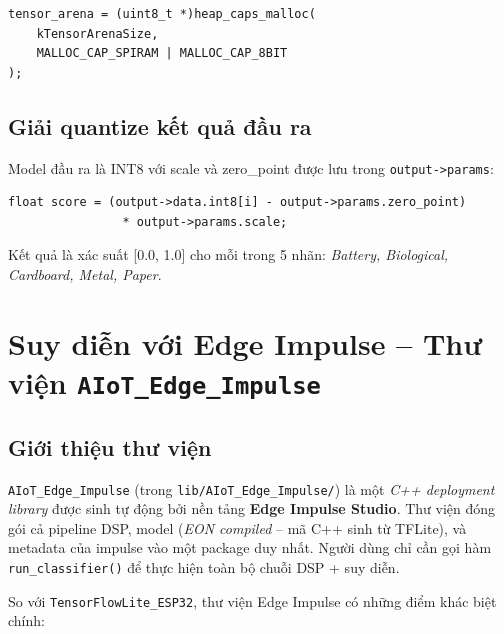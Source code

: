 \documentclass[12pt,a4paper]{article}
\begin{document}
\begin{lstlisting}[caption={Cấp phát tensor arena từ PSRAM}]
tensor_arena = (uint8_t *)heap_caps_malloc(
    kTensorArenaSize,
    MALLOC_CAP_SPIRAM | MALLOC_CAP_8BIT
);
\end{lstlisting}

\subsection{Giải quantize kết quả đầu ra}

Model đầu ra là INT8 với scale và zero\_point được lưu trong \texttt{output->params}:

\begin{lstlisting}[caption={Giải quantize giá trị INT8 ra xác suất float}]
float score = (output->data.int8[i] - output->params.zero_point)
                * output->params.scale;
\end{lstlisting}

Kết quả là xác suất [0.0, 1.0] cho mỗi trong 5 nhãn: \textit{Battery, Biological, Cardboard, Metal, Paper}.

\section{Suy diễn với Edge Impulse -- Thư viện \texttt{AIoT\_Edge\_Impulse}}

\subsection{Giới thiệu thư viện}

\texttt{AIoT\_Edge\_Impulse} (trong \texttt{lib/AIoT\_Edge\_Impulse/}) là một \emph{C++ deployment library} được sinh tự động bởi nền tảng \textbf{Edge Impulse Studio}. Thư viện đóng gói cả pipeline DSP, model (\emph{EON compiled} -- mã C++ sinh từ TFLite), và metadata của impulse vào một package duy nhất. Người dùng chỉ cần gọi hàm \texttt{run\_classifier()} để thực hiện toàn bộ chuỗi DSP + suy diễn.

So với \texttt{TensorFlowLite\_ESP32}, thư viện Edge Impulse có những điểm khác biệt chính:
\end{document}
